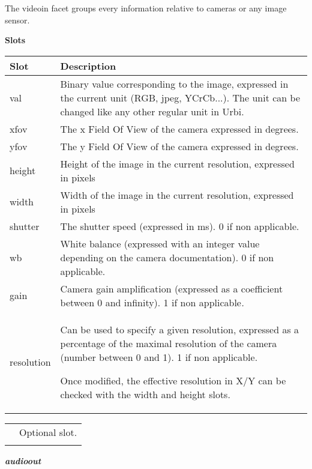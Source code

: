 \documentclass[a4paper]{article}
\begin{document}
{\sffamily
The videoin facet groups every information relative to cameras or any
image sensor. }

{\sffamily\bfseries
Slots}

\begin{flushleft}
\tablehead{}
\begin{supertabular}{|m{3.293cm}|m{11.997cm}|}
\hline
\sffamily\bfseries Slot &
\sffamily\bfseries Description\\\hline
val &
\sffamily Binary value corresponding to the
image, expressed in the current unit (RGB, jpeg, YCrCb...). The unit
can be changed like any other regular unit in Urbi. \\\hline
xfov &
\sffamily The x Field Of View of the camera
expressed in degrees.\\\hline
yfov &
\sffamily The y Field Of View of the camera
expressed in degrees.\\\hline
height &
\sffamily Height of the image in the current
resolution, expressed in pixels\\\hline
width &
\sffamily Width of the image in the current
resolution, expressed in pixels\\\hline
shutter &
\textsf{The shutter speed }\textsf{(expressed
in ms). 0 if non applicable.}\\\hline
wb &
\textsf{White balance }\textsf{(expressed with
an integer value depending on the camera documentation). 0 if non
applicable.}\\\hline
gain &
\textsf{Camera gain amplification
}\textsf{(expressed as a coefficient between 0 and infinity). 1 if non
applicable}\textsf{\textit{.}}\\\hline
resolution &
{\sffamily Can be used to specify a given
resolution, expressed as a percentage of the maximal resolution of the
camera (number between 0 and 1). 1 if non applicable. }

\sffamily Once modified, the effective
resolution in X/Y can be checked with the width and height
slots.\\\hline
\end{supertabular}
\end{flushleft}
\begin{flushleft}
\tablehead{}
\begin{supertabular}{|m{1.717cm}|m{10.464cm}}
\hhline{-~}
 &
Optional slot.\\\hhline{-~}
\end{supertabular}
\end{flushleft}
{\sffamily\bfseries\itshape
audioout}
\end{document}
